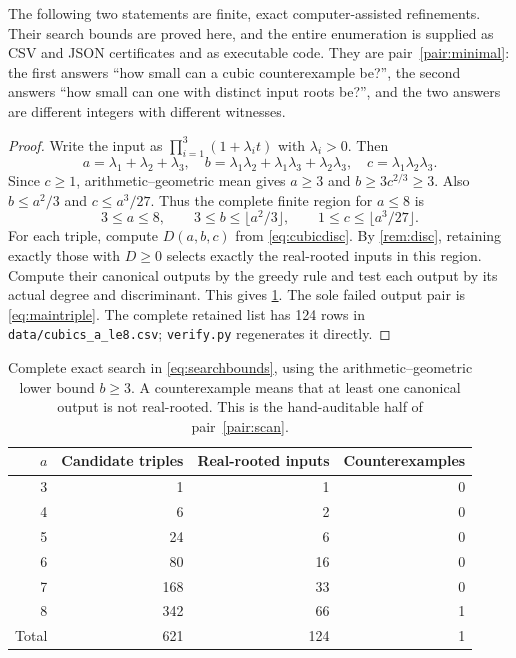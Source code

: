 \documentclass[11pt,letterpaper]{article}
\numberwithin{equation}{section}
\newtheorem{proposition}[theorem]{Proposition}
\theoremstyle{definition}
\theoremstyle{remark}
\begin{document}
The following two statements are finite, exact computer-assisted refinements.
Their search bounds are proved here, and the entire enumeration is supplied as
CSV and JSON certificates and as executable code. They are
pair~\ref{pair:minimal}: the first answers ``how small can a cubic
counterexample be?'', the second answers ``how small can one with distinct
input roots be?'', and the two answers are different integers with different
witnesses.

\begin{proof}
Write the input as $\prod_{i=1}^3(1+\lambda_it)$ with $\lambda_i>0$.
Then
\[
 a=\lambda_1+\lambda_2+\lambda_3,\quad
 b=\lambda_1\lambda_2+\lambda_1\lambda_3+\lambda_2\lambda_3,\quad
 c=\lambda_1\lambda_2\lambda_3.
\]
Since $c\ge1$, arithmetic--geometric mean gives $a\ge3$ and
$b\ge3c^{2/3}\ge3$. Also $b\le a^2/3$ and $c\le a^3/27$.
Thus the complete finite region for $a\le8$ is
\begin{equation}\label{eq:searchbounds}
 3\le a\le8,\qquad
 3\le b\le\lfloor a^2/3\rfloor,\qquad
 1\le c\le\lfloor a^3/27\rfloor.
\end{equation}
For each triple, compute $D(a,b,c)$ from \eqref{eq:cubicdisc}. By
\cref{rem:disc}, retaining exactly those with $D\ge0$ selects exactly the
real-rooted inputs in this region. Compute their canonical outputs by the
greedy rule and test each output by its actual degree and discriminant.
This gives \cref{tab:minimal}. The sole failed output pair is
\eqref{eq:maintriple}. The complete retained list has 124 rows in
\texttt{data/cubics\_a\_le8.csv}; \texttt{verify.py} regenerates it directly.
\end{proof}

\begin{table}[htbp]
\centering
\begin{tabular}{@{}rrrr@{}}
\toprule
$a$ & Candidate triples & Real-rooted inputs & Counterexamples\\
\midrule
3 & 1 & 1 & 0\\
4 & 6 & 2 & 0\\
5 & 24 & 6 & 0\\
6 & 80 & 16 & 0\\
7 & 168 & 33 & 0\\
8 & 342 & 66 & 1\\
\midrule
Total & 621 & 124 & 1\\
\bottomrule
\end{tabular}
\caption{Complete exact search in \eqref{eq:searchbounds}, using the
arithmetic--geometric lower bound $b\ge3$. A counterexample
means that at least one canonical output is not real-rooted. This is the
hand-auditable half of pair~\ref{pair:scan}.}
\label{tab:minimal}
\end{table}
\end{document}
